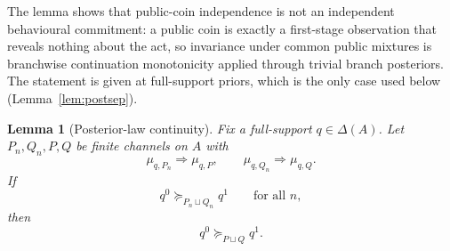 \documentclass[11pt,a4paper]{article}
\newtheorem{lemma}[theorem]{Lemma}
\theoremstyle{definition}
\newcommand{\1}{\mathbf 1}
\begin{document}
The lemma shows that public-coin independence is not an independent behavioural commitment: a public coin is exactly a
first-stage observation that reveals nothing about the act, so invariance under common public mixtures is branchwise
continuation monotonicity applied through trivial branch posteriors.  The statement is given at full-support priors,
which is the only case used below (Lemma~\ref{lem:postsep}).

\begin{lemma}[Posterior-law continuity]\label{lem:plcont}
Fix a full-support $q\in\Delta(A)$.  Let $P_n,Q_n,P,Q$ be finite channels on $A$ with
\[
\mu_{q,P_n}\Rightarrow \mu_{q,P},
\qquad
\mu_{q,Q_n}\Rightarrow \mu_{q,Q}.
\]
If
\[
q^0\succeq_{P_n\sqcup Q_n}q^1
\qquad\text{for all }n,
\]
then
\[
q^0\succeq_{P\sqcup Q}q^1.
\]
\end{lemma}
\end{document}
